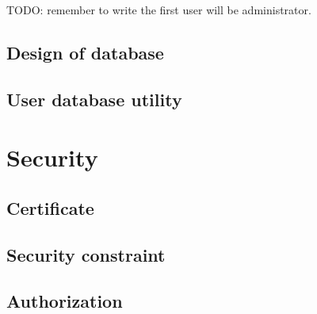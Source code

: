\textsf{TODO: remember to write the first user will be administrator.}

\subsection{Design of database}

\subsection{User database utility}

\section{Security}

\subsection{Certificate}

\subsection{Security constraint}

\subsection{Authorization}


